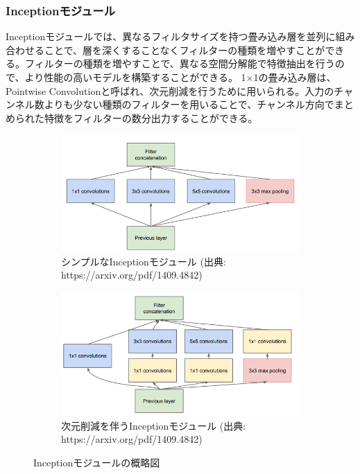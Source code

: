 \documentclass{ltjsarticle}
\begin{document}
\subsubsection{Inceptionモジュール}
Inceptionモジュールでは、異なるフィルタサイズを持つ畳み込み層を並列に組み合わせることで、層を深くすることなくフィルターの種類を増やすことができる。フィルターの種類を増やすことで、異なる空間分解能で特徴抽出を行うので、より性能の高いモデルを構築することができる。
1×1の畳み込み層は、Pointwise Convolutionと呼ばれ、次元削減を行うために用いられる。入力のチャンネル数よりも少ない種類のフィルターを用いることで、チャンネル方向でまとめられた特徴をフィルターの数分出力することができる。
\begin{figure}[ht]
  \centering
  \begin{subfigure}[b]{0.45\textwidth}
    \centering
    \includegraphics[width=\textwidth]{./capture/GoogLeNet_Inception_Naive.png}
    \caption{シンプルなInceptionモジュール (出典: https://arxiv.org/pdf/1409.4842)}
    \label{fig:Inception_Naive}
  \end{subfigure}
  \hfill
  \begin{subfigure}[b]{0.45\textwidth}
    \centering
    \includegraphics[width=\textwidth]{./capture/GoogLeNet_Inception_dimension_reductions.png}
    \caption{次元削減を伴うInceptionモジュール (出典: https://arxiv.org/pdf/1409.4842)}
    \label{fig:Inception_dimension_reductions}
  \end{subfigure}
  \caption{Inceptionモジュールの概略図}
\end{figure}
\end{document}
